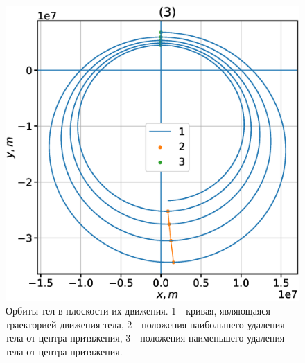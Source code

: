 \documentclass[12pt]{article}
\begin{document}
\begin{figure}[H]
    \endminipage\hfill
      \includegraphics[width=1.0\linewidth]{y_x_3.eps}
    \endminipage
    \caption{Орбиты тел в плоскости их движения. 1 - кривая, являющаяся траекторией движения тела, 
    2 - положения наибольшего удаления тела от центра притяжения, 3 - положения наименьшего удаления тела от центра притяжения.}
    \label{fig:7}
    \end{figure}
\end{document}
